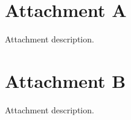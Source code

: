 \begin{appendices}
\section*{Attachment A}

Attachment description.



\newpage
\section*{Attachment B}

Attachment description.

\end{appendices}